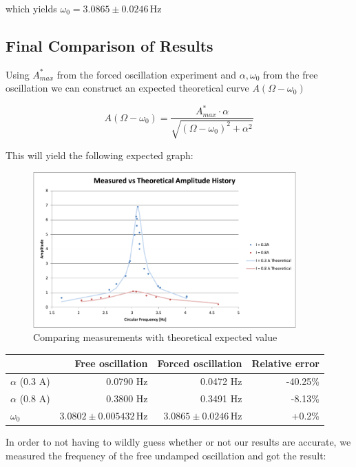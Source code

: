 \documentclass{scrreprt}
\newcommand{\unit}[1]{\ensuremath{\, \mathrm{#1}}}
\begin{document}
which yields $\omega_0 = 3.0865 \pm 0.0246 \unit{Hz}$
\subsection{Final Comparison of Results}

Using $A_{max}^*$ from the forced oscillation experiment and $\alpha, \omega_0$ from the free oscillation we can construct an expected theoretical curve $A(\Omega - \omega_0)$

\begin{equation}
A(\Omega - \omega_0) = \frac{A_{max}^* \cdot \alpha}{\sqrt{\left(\Omega - \omega_0\right)^2 + \alpha^2}}
\end{equation}

This will yield the following expected graph:

\begin{figure}[H]
	\centering
  \includegraphics[width=0.9\textwidth]{diag/meas_vs_theory.pdf}
	\caption{Comparing measurements with theoretical expected value}
	\label{fig:measvstheory}
\end{figure}

\begin{table}[H]
\center
\begin{tabular}{|l|rrr|}
\hline
&Free oscillation& Forced oscillation& Relative error\\
\hline\hline
$\alpha$ (0.3 A)& 0.0790 Hz & 0.0472 Hz & -40.25\%\\
$\alpha$ (0.8 A)& 0.3800 Hz & 0.3491 Hz & -8.13\%\\
$\omega_0$&$3.0802 \pm 0.005432 \unit{Hz}$&$ 3.0865 \pm 0.0246 \unit{Hz}$ & +0.2\%\\
\hline
\end{tabular}
\end{table}

In order to not having to wildly guess whether or not our results are accurate, we measured the frequency of the free undamped oscillation and got the result:
\end{document}
